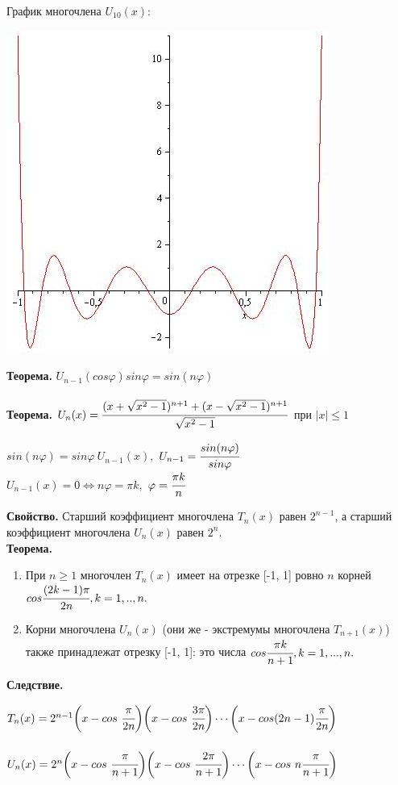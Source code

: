 \documentclass[12pt]{article}
\theoremstyle{definition}
\numberwithin{equation}{section}
\begin{document}
	График многочлена $U_{10}(x)$:\begin{center}
		\includegraphics[scale=0.5]{U10.jpg} \end{center}
	\textbf{Теорема.}
	$U_{n-1}(cos \varphi)sin \varphi = sin(n \varphi)$\\
	\\
	\textbf{Теорема.}
	$U_n(x)=\cfrac{(x+\sqrt{x^2-1})^{n+1}+(x-\sqrt{x^2-1})^{n+1}}{\sqrt{x^2-1}}$ при $ |x| \leqslant 1$
	\begin{center}
		$sin(n\varphi)=sin\varphi ~ U_{n-1}(x),$ $ U_{n-1}=\cfrac{sin(n\varphi)}{sin \varphi}$\\
		$U_{n-1}(x) = 0 \Leftrightarrow n\varphi=\pi k,$ $\varphi=\cfrac{\pi k}{n}$
	\end{center}
	\textbf{Свойство.}
	Старший коэффициент многочлена $T_n(x)$ равен $2^{n-1}$, а старший коэффициент многочлена $U_n(x)$ равен $2^n$.\\
	\newpage
	\noindent \textbf{Теорема.}\begin{enumerate}
		\item При $n \geqslant 1$ многочлен $T_n(x)$ имеет на отрезке [-1, 1] ровно $n$ корней $cos\cfrac{(2k-1)\pi}{2n}, k=1,..,n.$
		\item Корни многочлена $U_n(x)$ (они же - экстремумы многочлена $T_{n+1}(x)$) также принадлежат отрезку [-1, 1]: это числа $cos\cfrac{\pi k}{n+1}, k=1,...,n.$
	\end{enumerate}
	\textbf{Следствие.}\begin{center}
		$T_n(x)=2^{n-1} \bigg(x-cos~\cfrac{\pi}{2n}\bigg) \bigg(x-cos~\cfrac{3\pi}{2n}\bigg)\cdots \bigg(x-cos(2n-1)\cfrac{\pi}{2n} \bigg)$\\
		~\\
		$U_n(x)=2^n \bigg(x-cos~\cfrac{\pi}{n+1}\bigg) \bigg(x-cos~\cfrac{2\pi}{n+1} \bigg)\cdots \bigg(x-cos ~n\cfrac{\pi}{n+1}\bigg)$\end{center}
\end{document}
